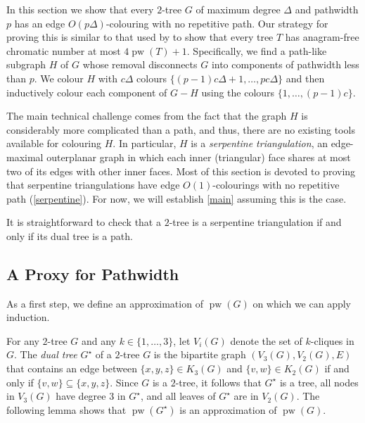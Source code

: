 \documentclass[kpfonts]{patmorin}
\DeclareMathOperator{\pw}{pw}
\begin{document}
In this section we show that every $2$-tree $G$ of maximum degree $\Delta$ and pathwidth $p$ has an edge $O(p\Delta)$-colouring with no repetitive path.  Our strategy for proving this is similar to that used by \citet{wilson.wood:anagram-free} to show that every tree $T$ has anagram-free chromatic number at most $4\pw(T)+1$.  Specifically, we find a path-like subgraph $H$ of $G$ whose removal disconnects $G$ into components of pathwidth less than $p$.  We colour $H$ with $c\Delta$ colours $\{(p-1)c\Delta+1,\ldots,pc\Delta\}$ and then inductively colour each component of $G-H$ using the colours $\{1,\ldots,(p-1)c\}$.

The main technical challenge comes from the fact that the graph $H$ is considerably more complicated than a path, and thus, there are no existing tools available for colouring $H$.  In particular, $H$ is a \emph{serpentine triangulation}, an edge-maximal outerplanar graph in which each inner (triangular) face shares at most two of its edges with other inner faces. Most of this section is devoted to proving that serpentine triangulations have edge $O(1)$-colourings with no repetitive path (\cref{serpentine}).  For now, we will establish \cref{main} assuming this is the case.





It is straightforward to check that a $2$-tree is a serpentine triangulation if and only if its dual tree is a path.


\subsection{A Proxy for Pathwidth}

As a first step, we define an approximation of $\pw(G)$ on which we can apply induction.

For any $2$-tree $G$ and any $k\in\{1,\ldots,3\}$, let $V_i(G)$ denote the set of $k$-cliques in $G$.  The \emph{dual tree} $G^\star$ of a $2$-tree $G$ is the bipartite graph $(V_3(G),V_2(G),E)$ that contains an edge between $\{x,y,z\}\in K_3(G)$ and $\{v,w\}\in K_2(G)$ if and only if $\{v,w\}\subseteq\{x,y,z\}$.  Since $G$ is a $2$-tree, it follows that $G^\star$ is a tree, all nodes in $V_3(G)$ have degree $3$ in $G^\star$, and all leaves of $G^\star$ are in $V_2(G)$.  The following lemma shows that $\pw(G^\star)$ is an approximation of $\pw(G)$.
\end{document}
